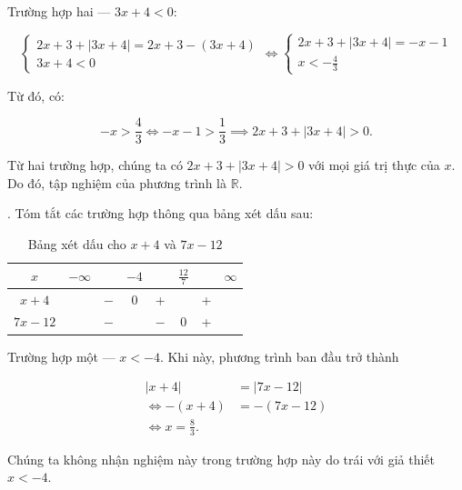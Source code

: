 \textcolor{colorEmphasis}{Trường hợp hai --- $3x + 4 < 0$}:

\begin{equation*}
   \begin{cases}
      2x + 3 + |3x + 4| = 2x + 3 - (3x + 4) \\
      3x + 4 < 0
   \end{cases} \iff \begin{cases}
      2x + 3 + |3x + 4| = -x - 1 \\
      x < -\frac{4}{3}
   \end{cases}
\end{equation*}

Từ đó, có:

\begin{equation*}
   -x > \frac{4}{3} \iff -x - 1 > \frac{1}{3} \implies 2x + 3 + |3x + 4| > 0.
\end{equation*}

Từ hai trường hợp, chúng ta có $2x + 3 + |3x + 4| > 0$ với mọi giá trị thực của $x$. Do đó, tập nghiệm của phương trình là $\mathbb{R}$.

. Tóm tắt các trường hợp thông qua bảng xét dấu sau:

\begin{table}[H]
   \centering
   \begin{tabular}{|c|ccccccc|}
   \hline
   $x$          & $-\infty$ &     & $-4$ &     & $\frac{12}{7}$ &   & $\infty$ \\
   \hline
   $x+4$        &           & $-$ &  0  &  +  &     & + &           \\
   \hline
   $7x-12$        &           & $-$ &     & $-$ &  0  & + &           \\
   \hline
   \end{tabular}
   \caption{Bảng xét dấu cho $x+4$ và $7x-12$}
   \label{tab:nen_tang_lo_gich:ham_so_mot_bien:ham_tung_phan:gpt7}
\end{table}

\textcolor{colorEmphasisCyan}{Trường hợp một --- $x < -4$}. Khi này, phương trình ban đầu trở thành

\begin{align*}
   |x + 4| &= |7x - 12| \\
   \iff -(x + 4) &= -(7x - 12) \\
   \iff x = \frac{8}{3}.
\end{align*}

Chúng ta không nhận nghiệm này trong trường hợp này do trái với giả thiết $x < -4$.

